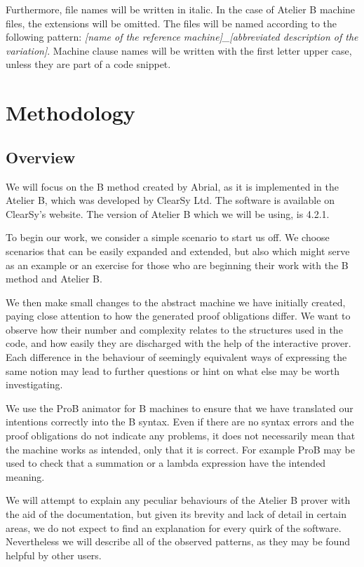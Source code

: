 \documentclass[12pt,journal,duplex]{IEEEtran}
\begin{document}
	Furthermore, file names will be written in italic. In the case of Atelier B machine files, the extensions will be omitted. The files will be named according to the following pattern: \emph{[name of the reference machine]\_[abbreviated description of the variation]}. Machine clause names will be written with the first letter upper case, unless they are part of a code snippet.

	\section{Methodology}
	\subsection{Overview}
	We will focus on the B method created by Abrial, as it is implemented in the Atelier B, which was developed by ClearSy Ltd. The software is available on ClearSy's website. The version of Atelier B which we will be using, is 4.2.1.

	To begin our work, we consider a simple scenario to start us off. We choose scenarios that can be easily expanded and extended, but also which might serve as an example or an exercise for those who are beginning their work with the B method and Atelier B.

	We then make small changes to the abstract machine we have initially created, paying close attention to how the generated proof obligations differ. We want to observe how their number and complexity relates to the structures used in the code, and how easily they are discharged with the help of the interactive prover. Each difference in the behaviour of seemingly equivalent ways of expressing the same notion may lead to further questions or hint on what else may be worth investigating.

	We use the ProB animator for B machines to ensure that we have translated our intentions correctly into the B syntax. Even if there are no syntax errors and the proof obligations do not indicate any problems, it does not necessarily mean that the machine works as intended, only that it is correct. For example ProB may be used to check that a summation or a lambda expression have the intended meaning.

	We will attempt to explain any peculiar behaviours of the Atelier B prover with the aid of the documentation, but given its brevity and lack of detail in certain areas, we do not expect to find an explanation for every quirk of the software. Nevertheless we will describe all of the observed patterns, as they may be found helpful by other users.
\end{document}
